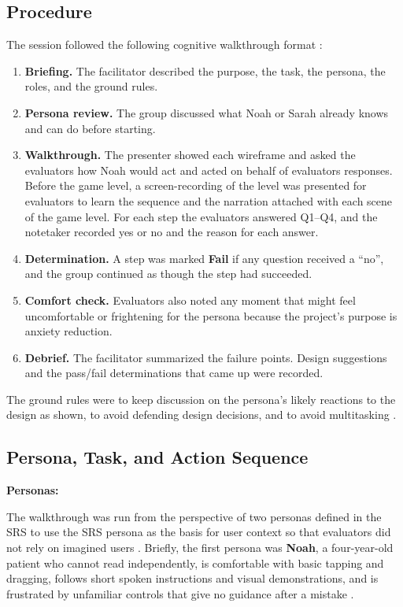 \documentclass{article}
\newcommand{\fail}{{\textbf{Fail}}}
\begin{document}
\subsection{Procedure}

The session followed the following cognitive walkthrough format \cite{nng-workshop}:
\begin{enumerate}
  \item \textbf{Briefing.} The facilitator described the purpose, the task, the persona, the roles, 
  and the ground rules.
  \item \textbf{Persona review.} The group discussed what Noah or Sarah already knows and can do 
  before starting.
  \item \textbf{Walkthrough.} The presenter showed each wireframe and asked the evaluators how 
  Noah would act and acted on behalf of evaluators responses. Before the game level, a screen-recording 
  of the level was presented for evaluators to learn the sequence and the narration attached with each 
  scene of the game level. For each step the evaluators answered 
  Q1--Q4, and the notetaker recorded yes or no and the reason for each answer.
  \item \textbf{Determination.} A step was marked \fail{} if any question received a ``no'', and 
  the group continued as though the step had succeeded.
  \item \textbf{Comfort check.} Evaluators also noted any moment that might feel uncomfortable or 
  frightening for the persona because the project's purpose is anxiety reduction.
  \item \textbf{Debrief.} The facilitator summarized the failure points. Design suggestions and 
  the pass/fail determinations that came up were recorded.

\end{enumerate}
The ground rules were to keep discussion on the persona's likely reactions to the design as shown, 
to avoid defending design decisions, and to avoid multitasking \cite{nng-workshop}.

\subsection{Persona, Task, and Action Sequence}

\textbf{Personas:}

The walkthrough was run from the perspective of two personas defined in the SRS 
\cite{srs} to use the SRS persona as the basis for user context so that evaluators did not rely on 
imagined users \cite{nng-workshop}. Briefly, the first persona was \textbf{Noah}, a four-year-old 
patient who cannot read independently, is comfortable with basic tapping and dragging, follows short 
spoken instructions and visual demonstrations, and is frustrated by unfamiliar controls that give no 
guidance after a mistake \cite{srs}. 
\end{document}
